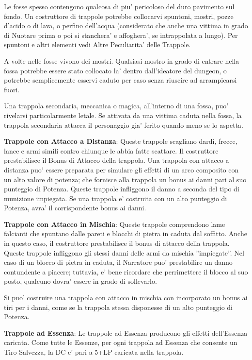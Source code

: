 \documentclass[a4paper,11pt,twoside,openany]{book}
\begin{document}
Le fosse spesso contengono qualcosa di piu' pericoloso del duro pavimento sul fondo. Un costruttore di trappole potrebbe collocarvi spuntoni, mostri, pozze d'acido o di lava, o perfino dell'acqua (considerato che anche una vittima in grado di Nuotare prima o poi si stanchera' e affoghera', se intrappolata a lungo). Per spuntoni e altri elementi vedi Altre Peculiarita' delle Trappole.

A volte nelle fosse vivono dei mostri. Qualsiasi mostro in grado di entrare nella fossa potrebbe essere stato collocato la' dentro dall'ideatore del dungeon, o potrebbe semplicemente esservi caduto per caso senza riuscire ad arrampicarsi fuori.

Una trappola secondaria, meccanica o magica, all'interno di una fossa, puo' rivelarsi particolarmente letale. Se attivata da una vittima caduta nella fossa, la trappola secondaria attacca il personaggio gia' ferito quando meno se lo aspetta.

\textbf{Trappole con Attacco a Distanza}: Queste trappole scagliano dardi, frecce, lance e armi simili contro chiunque le abbia fatte scattare. Il costruttore prestabilisce il Bonus di Attacco della trappola. Una trappola con attacco a distanza puo' essere preparata per simulare gli effetti di un arco composito con un alto valore di potenza; che fornisce alla trappola un bonus ai danni pari al suo punteggio di Potenza. Queste trappole infliggono il danno a seconda del tipo di munizione impiegata. Se una trappola e' costruita con un alto punteggio di Potenza, avra' il corrispondente bonus ai danni.

\textbf{Trappole con Attacco in Mischia}: Queste trappole comprendono lame falcianti che spuntano dalle pareti e blocchi di pietra in caduta dal soffitto. Anche in questo caso, il costruttore prestabilisce il bonus di attacco della trappola. Queste trappole infliggono gli stessi danni delle armi da mischia ''impiegate''. Nel caso di un blocco di pietra in caduta, il Narratore puo' prestabilire un danno contundente a piacere; tuttavia, e' bene ricordare che perrimettere il blocco al suo posto, qualcuno dovra' essere in grado di sollevarlo.

Si puo' costruire una trappola con attacco in mischia con incorporato un bonus ai tiri per i danni, come se la trappola stessa disponesse di un alto punteggio di Potenza.

\textbf{Trappole ad Essenza}: Le trappole ad Essenza producono gli effetti dell'Essenza caricata. Come tutte le Essenze, per ogni trappola ad Essenza che consente un Tiro Salvezza, la DC e' pari a 5+LP caricata nella trappola.
\end{document}
